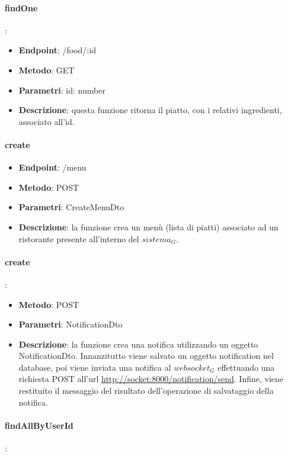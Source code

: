 \paragraph{findOne}:
\begin{itemize}
    \item \textbf{Endpoint}: /food/:id
    \item \textbf{Metodo}: GET
    \item \textbf{Parametri}: id: number
    \item \textbf{Descrizione}: questa funzione ritorna il piatto, con i relativi ingredienti, associato all'id.
\end{itemize}
\paragraph{create} 

\begin{itemize}
    \item \textbf{Endpoint}: /menu
    \item \textbf{Metodo}: POST
    \item \textbf{Parametri}: CreateMenuDto
    \item \textbf{Descrizione}: la funzione crea un menù (lista di piatti) associato ad un ristorante presente all'interno del $\textit{sistema}_G$.
\end{itemize}

\paragraph{create}:
\begin{itemize}
    \item \textbf{Metodo}: POST
    \item \textbf{Parametri}: NotificationDto
    \item \textbf{Descrizione}: la funzione crea una notifica utilizzando un oggetto NotificationDto. Innanzitutto viene salvato un oggetto notification nel database, poi viene inviata una notifica al $\textit{websocket}_G$ effettuando una richiesta POST all'url \url{http://socket:8000/notification/send}. Infine, viene restituito il messaggio del risultato dell'operazione di salvataggio della notifica. 
\end{itemize}
\paragraph{findAllByUserId}:

